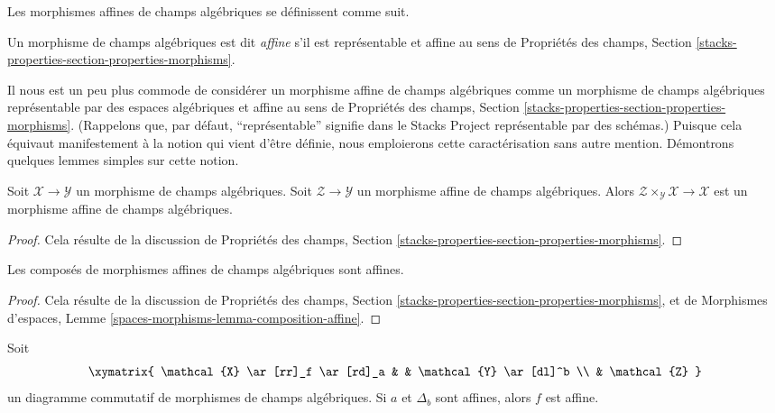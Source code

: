 \noindent
Les morphismes affines de champs algébriques se définissent comme suit.

\begin{definition}
\label{definition-affine}
Un morphisme de champs algébriques est dit {\it affine} s'il est représentable
et affine au sens de Propriétés des champs, Section
\ref{stacks-properties-section-properties-morphisms}.
\end{definition}

\noindent
Il nous est un peu plus commode de considérer un morphisme affine de champs
algébriques comme un morphisme de champs algébriques représentable par des
espaces algébriques et affine au sens de Propriétés des champs, Section
\ref{stacks-properties-section-properties-morphisms}.
(Rappelons que, par défaut, ``représentable'' signifie dans le Stacks Project
représentable par des schémas.) Puisque cela équivaut manifestement à la notion
qui vient d'être définie, nous emploierons cette caractérisation sans autre
mention. Démontrons quelques lemmes simples sur cette notion.

\begin{lemma}
\label{lemma-base-change-affine}
Soit $\mathcal{X} \to \mathcal{Y}$ un morphisme de champs algébriques.
Soit $\mathcal{Z} \to \mathcal{Y}$ un morphisme affine de champs algébriques.
Alors $\mathcal{Z} \times_\mathcal{Y} \mathcal{X} \to \mathcal{X}$ est un
morphisme affine de champs algébriques.
\end{lemma}

\begin{proof}
Cela résulte de la discussion de Propriétés des champs, Section
\ref{stacks-properties-section-properties-morphisms}.
\end{proof}

\begin{lemma}
\label{lemma-composition-affine}
Les composés de morphismes affines de champs algébriques sont affines.
\end{lemma}

\begin{proof}
Cela résulte de la discussion de Propriétés des champs, Section
\ref{stacks-properties-section-properties-morphisms}, et de Morphismes
d'espaces, Lemme \ref{spaces-morphisms-lemma-composition-affine}.
\end{proof}

\begin{lemma}
\label{lemma-affine-permanence}
Soit
$$
\xymatrix{
\mathcal{X} \ar[rr]_f \ar[rd]_a & & \mathcal{Y} \ar[dl]^b \\
& \mathcal{Z}
}
$$
un diagramme commutatif de morphismes de champs algébriques.
Si $a$ et $\Delta_b$ sont affines, alors $f$ est affine.
\end{lemma}

